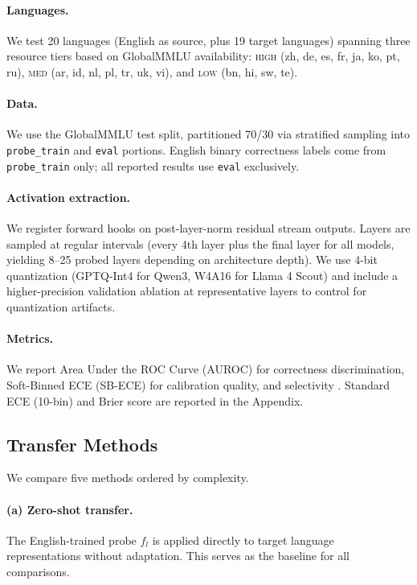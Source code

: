 \paragraph{Languages.} We test 20 languages (English as source, plus 19 target languages) spanning three resource tiers based on GlobalMMLU availability: \textsc{high} (zh, de, es, fr, ja, ko, pt, ru), \textsc{med} (ar, id, nl, pl, tr, uk, vi), and \textsc{low} (bn, hi, sw, te).

\paragraph{Data.} We use the GlobalMMLU test split, partitioned 70/30 via stratified sampling into \texttt{probe\_train} and \texttt{eval} portions. English binary correctness labels come from \texttt{probe\_train} only; all reported results use \texttt{eval} exclusively.

\paragraph{Activation extraction.} We register forward hooks on post-layer-norm residual stream outputs. Layers are sampled at regular intervals (every 4th layer plus the final layer for all models, yielding 8--25 probed layers depending on architecture depth). We use 4-bit quantization (GPTQ-Int4 for Qwen3, W4A16 for Llama 4 Scout) and include a higher-precision validation ablation at representative layers to control for quantization artifacts.

\paragraph{Metrics.} We report Area Under the ROC Curve (AUROC) for correctness discrimination, Soft-Binned ECE (SB-ECE) \citep{karandikar2021sbece} for calibration quality, and selectivity \citep{hewitt2019control}. Standard ECE (10-bin) and Brier score are reported in the Appendix.

\subsection{Transfer Methods}
\label{sec:transfer}

We compare five methods ordered by complexity.

\paragraph{(a) Zero-shot transfer.} The English-trained probe $f_l$ is applied directly to target language representations without adaptation. This serves as the baseline for all comparisons.

